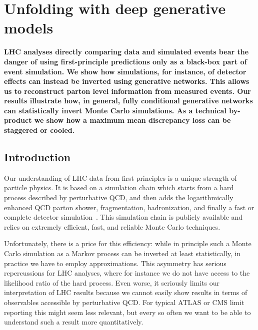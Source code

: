 %
%
%

\chapter{Unfolding with deep generative models}\label{chap:gan}
\enlargethispage{2ex}
\vspace*{-2pt}

\enlargethispage{2ex}

{\bf LHC analyses directly comparing data and simulated events bear the 
danger of using first-principle predictions only as a black-box part of event simulation. We show how simulations, for instance, of detector effects can instead be inverted using generative networks. This allows us to reconstruct parton level information from measured events. Our results illustrate how, in general, fully conditional generative networks can statistically invert Monte Carlo simulations. As a technical by-product we show how a maximum mean discrepancy loss can be staggered or cooled.}
  
\section{Introduction}
\label{sec:ganintro}

Our understanding of LHC data from first principles is a unique
strength of particle physics. It is based on a simulation chain which
starts from a hard process described by perturbative QCD, and then
adds the logarithmically enhanced QCD parton shower, fragmentation,
hadronization, and finally a fast or complete detector
simulation~\cite{black_book}. This simulation chain is publicly
available and relies on extremely efficient, fast, and reliable Monte
Carlo techniques.

Unfortunately, there is a price for this efficiency: while in
principle such a Monte Carlo simulation as a Markov process can be
inverted at least statistically, in practice we have to employ
approximations. This asymmetry has serious repercussions for LHC
analyses, where for instance we do not have access to the likelihood
ratio of the hard process. Even worse, it seriously limits our
interpretation of LHC results because we cannot easily show results in
terms of observables accessible by perturbative QCD. For typical ATLAS
or CMS limit reporting this might seem less relevant, but every so
often we want to be able to understand such a result more
quantitatively.

